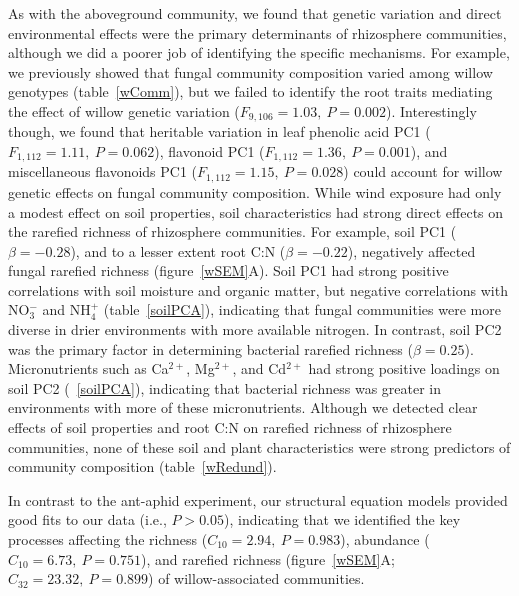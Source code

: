 \documentclass[11pt]{article}
\begin{document}
As with the aboveground community, we found that genetic
variation and direct environmental effects were the primary determinants
of rhizosphere communities, although we did a poorer job of identifying
the specific mechanisms. For example, we previously showed that fungal
community composition varied among willow genotypes (table~\ref{wComm}), but we
failed to identify the root traits mediating the effect of willow
genetic variation (\(F_{9,106}=1.03,\ P=0.002\)). Interestingly though, we found that heritable variation in leaf phenolic acid PC1 (\(F_{1,112} = 1.11,\ P=0.062\)), flavonoid PC1 (\(F_{1,112} = 1.36,\ P=0.001\)), and miscellaneous flavonoids PC1 (\(F_{1,112} = 1.15,\ P=0.028\)) could account for willow genetic effects on fungal community composition.
While wind exposure had only a modest effect on soil
properties, soil characteristics had strong direct effects on the
rarefied richness of rhizosphere communities. For example, soil PC1
($\beta = -0.28$), and to a lesser extent root C:N ($\beta =
-0.22$), negatively affected fungal rarefied richness (figure~\ref{wSEM}A). Soil PC1
had strong positive correlations with soil moisture and organic matter,
but negative correlations with NO$_3^-$ and NH$_4^+$ (table~\ref{soilPCA}), indicating that
fungal communities were more diverse in drier environments with more
available nitrogen. In contrast, soil PC2 was the primary factor in
determining bacterial rarefied richness ($\beta = 0.25$).
Micronutrients such as Ca$^{2+}$, Mg$^{2+}$, and Cd$^{2+}$ had strong positive loadings
on soil PC2 (~\ref{soilPCA}), indicating that bacterial richness was greater in
environments with more of these micronutrients. 
Although we detected
clear effects of soil properties and root C:N on rarefied richness of
rhizosphere communities, none of these soil and plant
characteristics were strong predictors of community
composition (table~\ref{wRedund}).

In contrast to the ant-aphid experiment, our structural equation models
provided good fits to our data (i.e., \(P>0.05\)), indicating
that we identified the key processes affecting the richness (\(C_{10}=2.94,\ P=0.983\)), abundance (\(C_{10}=6.73,\ P=0.751\)), and rarefied richness
(figure~\ref{wSEM}A; \(C_{32}=23.32,\ P=0.899\)) of willow-associated communities.
\end{document}
